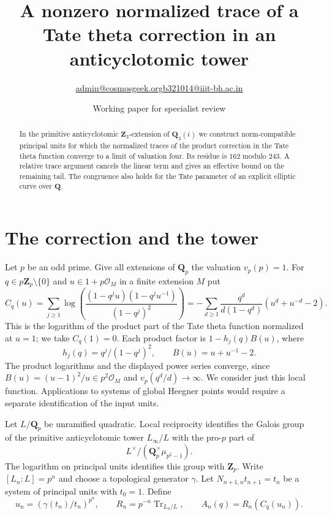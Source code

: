 \documentclass[11pt]{article}
\title{A nonzero normalized trace of a Tate theta correction in an anticyclotomic tower}
\author{\small \href{mailto:admin@cosmosgeek.org}{admin@cosmosgeek.org}\qquad \href{mailto:b321014@iiit-bh.ac.in}{b321014@iiit-bh.ac.in}}
\date{Working paper for specialist review}
\newcommand{\Z}{\mathbf Z}\newcommand{\Q}{\mathbf Q}
\newcommand{\cO}{\mathcal O}
\begin{document}
\maketitle
\begin{abstract}
In the primitive anticyclotomic $\Z_3$-extension of $\Q_3(i)$ we construct norm-compatible principal units for which the normalized traces of the product correction in the Tate theta function converge to a limit of valuation four. Its residue is $162$ modulo $243$. A relative trace argument cancels the linear term and gives an effective bound on the remaining tail. The congruence also holds for the Tate parameter of an explicit elliptic curve over $\Q$.
\end{abstract}

\section{The correction and the tower}

Let $p$ be an odd prime. Give all extensions of $\Q_p$ the valuation $v_p(p)=1$. For $q\in p\Z_p\setminus\{0\}$ and $u\in1+p\cO_M$ in a finite extension $M$ put
\[
 C_q(u)=\sum_{j\ge1}\log\left(\frac{(1-q^ju)(1-q^ju^{-1})}{(1-q^j)^2}\right)
       =-\sum_{d\ge1}\frac{q^d}{d(1-q^d)}(u^d+u^{-d}-2).
\]
This is the logarithm of the product part of the Tate theta function \cite{tate} normalized at $u=1$; we take $C_q(1)=0$. Each product factor is $1-h_j(q)B(u)$, where
\[
 h_j(q)=q^j/(1-q^j)^2,\qquad B(u)=u+u^{-1}-2.
\]
The product logarithms and the displayed power series converge, since $B(u)=(u-1)^2/u\in p^2\cO_M$ and $v_p(q^d/d)\to\infty$. We consider just this local function. Applications to systems of global Heegner points would require a separate identification of the input units.

Let $L/\Q_p$ be unramified quadratic. Local reciprocity identifies the Galois group of the primitive anticyclotomic tower $L_\infty/L$ with the pro-$p$ part of
\[
 L^\times/(\Q_p^\times\mu_{p^2-1}).
\]
The logarithm on principal units identifies this group with $\Z_p$. Write $[L_n:L]=p^n$ and choose a topological generator $\gamma$. Let $N_{n+1,n}t_{n+1}=t_n$ be a system of principal units with $t_0=1$. Define
\[
 u_n=(\gamma(t_n)/t_n)^{p^n},\qquad
 R_n=p^{-n}\operatorname{Tr}_{L_n/L},\qquad A_n(q)=R_n(C_q(u_n)).
\]
\end{document}

